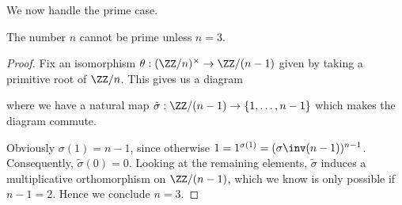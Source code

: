 We now handle the prime case.
\begin{proposition}
	The number $n$ cannot be prime unless $n = 3$.
	\label{prop:primroot}
\end{proposition}
\begin{proof}
	Fix an isomorphism $\theta : (\ZZ/n)^\times \to \ZZ/(n-1)$
	given by taking a primitive root of $\ZZ/n$.
	This gives us a diagram
	\begin{center}
	\end{center}
	where we have a natural map
	$\tilde{\sigma} : \ZZ/(n-1) \to \{1, \dots, n-1\}$
	which makes the diagram commute.

	Obviously $\sigma(1) = n-1$,
	since otherwise $1 = 1^{\sigma(1)} = (\sigma\inv(n-1))^{n-1}$.
	Consequently, $\tilde{\sigma}(0) = 0$.
	Looking at the remaining elements,
	$\tilde{\sigma}$ induces a multiplicative orthomorphism on $\ZZ/(n-1)$,
	which we know is only possible if $n-1=2$.
	Hence we conclude $n = 3$.
\end{proof}

